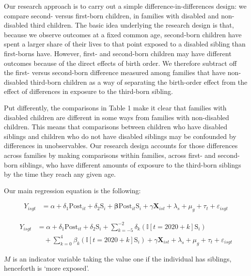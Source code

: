 Our research approach is to carry out a simple difference-in-differences design: we compare second- versus first-born children, in families with disabled and non-disabled third children. The basic idea underlying the research design is that, because we observe outcomes at a fixed common age, second-born children have spent a larger share of their lives to that point exposed to a disabled sibling than first-borns have. However, first- and second-born children may have different outcomes because of the direct effects of birth order. We therefore subtract off the first- versus second-born difference measured among families that have non-disabled third-born children as a way of separating the birth-order effect from the effect of differences in exposure to the third-born sibling. 

Put differently, the comparisons in Table 1 make it clear that families with disabled children are different in some ways from families with non-disabled children. This means that comparisons between children who have disabled siblings and children who do not have disabled siblings may be confounded by differences in unobservables. Our research design accounts for those differences across families by making comparisons within families, across first- and second-born siblings, who have different amounts of exposure to the third-born siblings by the time they reach any given age. 

Our main regression equation is the following:

    \begin{align}
    Y_{isgt} &= \alpha + \delta_1 \text{Post}_{it} + \delta_2 \text{S}_{i}   + \boldsymbol{\beta} \text{Post}_{it} \text{S}_{i}  + \gamma\mathbf{X}_{ist} + \lambda_s + \mu_g + \tau_t + \varepsilon_{isgt}
    \end{align}

     \begin{align}
    Y_{isgt} &= \alpha + \delta_1 \text{Post}_{it} + \delta_2 \text{S}_{i}   + \sum_{k=-5}^{-2} \delta_k (\mathbb{I}[t = 2020+k] \text{S}_{i}) \nonumber \\
    & \quad + \sum_{k=0}^{4} \beta_k (\mathbb{I}[t = 2020 + k]  \text{S}_{i})  + \gamma\mathbf{X}_{ist} + \lambda_s + \mu_g + \tau_t + \varepsilon_{isgt}
    \end{align}   


$M$ is an indicator variable taking the value one if the individual has siblings, henceforth is ‘more exposed’.
    
